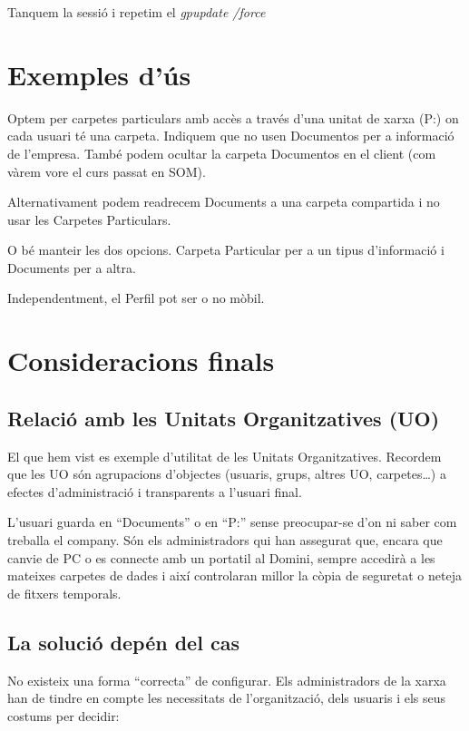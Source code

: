 \documentclass[
  a4paper,
]{article}
\begin{document}
Tanquem la sessió i repetim el \emph{gpupdate /force}

\section{Exemples d'ús}\label{exemples-duxfas}

Optem per carpetes particulars amb accès a través d'una unitat de xarxa
(P:) on cada usuari té una carpeta. Indiquem que no usen Documentos per
a informació de l'empresa. També podem ocultar la carpeta Documentos en
el client (com vàrem vore el curs passat en SOM).

Alternativament podem readrecem Documents a una carpeta compartida i no
usar les Carpetes Particulars.

O bé manteir les dos opcions. Carpeta Particular per a un tipus
d'informació i Documents per a altra.

Independentment, el Perfil pot ser o no mòbil.

\section{Consideracions finals}\label{consideracions-finals}

\subsection{Relació amb les Unitats Organitzatives
(UO)}\label{relaciuxf3-amb-les-unitats-organitzatives-uo}

El que hem vist es exemple d'utilitat de les Unitats Organitzatives.
Recordem que les UO són agrupacions d'objectes (usuaris, grups, altres
UO, carpetes\ldots) a efectes d'administració i transparents a l'usuari
final.

L'usuari guarda en ``Documents'' o en ``P:'' sense preocupar-se d'on ni
saber com treballa el company. Són els administradors qui han assegurat
que, encara que canvie de PC o es connecte amb un portatil al Domini,
sempre accedirà a les mateixes carpetes de dades i així controlaran
millor la còpia de seguretat o neteja de fitxers temporals.

\subsection{La solució depén del
cas}\label{la-soluciuxf3-depuxe9n-del-cas}

No existeix una forma ``correcta'' de configurar. Els administradors de
la xarxa han de tindre en compte les necessitats de l'organització, dels
usuaris i els seus costums per decidir:
\end{document}
